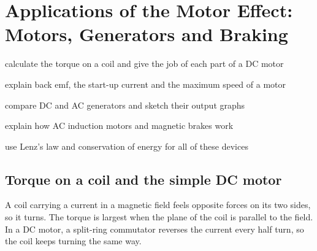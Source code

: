 \chapter[Motors, Generators and Braking]{Applications of the Motor Effect: Motors, Generators and Braking}\label{ch5:chap}



\begin{goals}
  \item calculate the torque on a coil and give the job of each part of a DC motor
  \item explain back emf, the start-up current and the maximum speed of a motor
  \item compare DC and AC generators and sketch their output graphs
  \item explain how AC induction motors and magnetic brakes work
  \item use Lenz's law and conservation of energy for all of these devices
\end{goals}

\section{Torque on a coil and the simple DC motor}\label{ch5:sec:torque}

\begin{bigidea}
A coil carrying a current in a magnetic field feels opposite forces on its two
sides, so it turns. The torque is largest when the plane of the coil is parallel to
the field. In a DC motor, a split-ring commutator reverses the current every half
turn, so the coil keeps turning the same way.
\end{bigidea}

